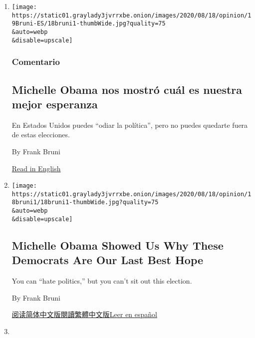 \begin{enumerate}
\def\labelenumi{\arabic{enumi}.}
\item
  \href{/es/2020/08/19/espanol/opinion/michelle-obama-discurso.html}{}

  \texttt{[image: https://static01.graylady3jvrrxbe.onion/images/2020/08/18/opinion/19Bruni-ES/18bruni1-thumbWide.jpg?quality=75\\\&auto=webp\\\&disable=upscale]}

  \hypertarget{comentario}{%
  \subsubsection{Comentario}\label{comentario}}

  \hypertarget{michelle-obama-nos-mostruxf3-cuuxe1l-es-nuestra-mejor-esperanza}{%
  \subsection{Michelle Obama nos mostró cuál es nuestra mejor
  esperanza}\label{michelle-obama-nos-mostruxf3-cuuxe1l-es-nuestra-mejor-esperanza}}

  En Estados Unidos puedes ``odiar la política'', pero no puedes
  quedarte fuera de estas elecciones.

  By Frank Bruni

  \href{https://www.nytimes3xbfgragh.onion/2020/08/18/opinion/michelle-obama-dnc-election-2020.html}{Read
  in English}
\item
  \href{/2020/08/18/opinion/michelle-obama-dnc-election-2020.html}{}

  \texttt{[image: https://static01.graylady3jvrrxbe.onion/images/2020/08/18/opinion/18bruni1/18bruni1-thumbWide.jpg?quality=75\\\&auto=webp\\\&disable=upscale]}

  \hypertarget{michelle-obama-showed-us-why-these-democrats-are-our-last-best-hope}{%
  \subsection{Michelle Obama Showed Us Why These Democrats Are Our Last
  Best
  Hope}\label{michelle-obama-showed-us-why-these-democrats-are-our-last-best-hope}}

  You can ``hate politics,'' but you can't sit out this election.

  By Frank Bruni

  \href{https://cn.nytimes3xbfgragh.onion/opinion/20200819/michelle-obama-dnc-election-2020/}{阅读简体中文版}\href{https://cn.nytimes3xbfgragh.onion/opinion/20200819/michelle-obama-dnc-election-2020/zh-hant}{閱讀繁體中文版}\href{https://www.nytimes3xbfgragh.onion/es/2020/08/19/espanol/opinion/michelle-obama-discurso.html}{Leer
  en español}
\item
  \href{/2020/08/14/opinion/kamala-harris-biden-2020.html}{}


\end{enumerate}
